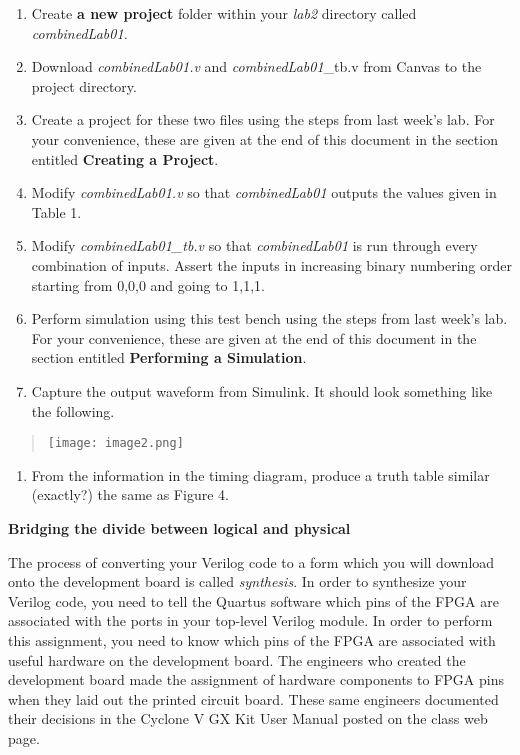 \begin{enumerate}
\def\labelenumi{\arabic{enumi}.}
\item
  Create \textbf{a new project} folder within your \emph{lab2} directory
  called \emph{combinedLab01.}
\item
  Download \emph{combinedLab01.v} and \emph{combinedLab01}\_tb.v from
  Canvas to the project directory.
\item
  Create a project for these two files using the steps from last week's
  lab. For your convenience, these are given at the end of this document
  in the section entitled \textbf{Creating a Project}.
\item
  Modify \emph{combinedLab01.v} so that \emph{combinedLab01} outputs the
  values given in Table 1.
\item
  Modify \emph{combinedLab01\_tb.v} so that \emph{combinedLab01} is run
  through every combination of inputs. Assert the inputs in increasing
  binary numbering order starting from 0,0,0 and going to 1,1,1.
\item
  Perform simulation using this test bench using the steps from last
  week's lab. For your convenience, these are given at the end of this
  document in the section entitled \textbf{Performing a Simulation}.
\item
  \protect\hypertarget{CombinedLab01_Waveform}{}{}Capture the output
  waveform from Simulink. It should look something like the following.
\end{enumerate}

\begin{quote}
\texttt{[image: image2.png]}
\end{quote}

\begin{enumerate}
\def\labelenumi{\arabic{enumi}.}
\setcounter{enumi}{7}
\item
  From the information in the timing diagram, produce a truth table
  similar (exactly?) the same as Figure 4.
\end{enumerate}

\textbf{Bridging the divide between logical and physical}

The process of converting your Verilog code to a form which you will
download onto the development board is called \emph{synthesis}. In order
to synthesize your Verilog code, you need to tell the Quartus software
which pins of the FPGA are associated with the ports in your top-level
Verilog module. In order to perform this assignment, you need to know
which pins of the FPGA are associated with useful hardware on the
development board. The engineers who created the development board made
the assignment of hardware components to FPGA pins when they laid out
the printed circuit board. These same engineers documented their
decisions in the Cyclone V GX Kit User Manual posted on the class web
page.

